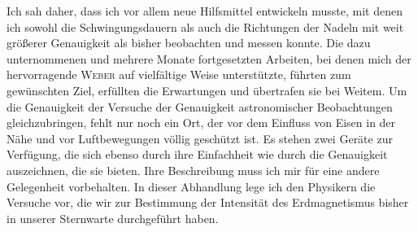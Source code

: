 Ich sah daher, dass ich vor allem neue Hilfsmittel entwickeln musste, mit denen ich sowohl die Schwingungsdauern als auch die Richtungen der Nadeln mit weit größerer Genauigkeit als bisher beobachten und messen konnte. Die dazu unternommenen und mehrere Monate fortgesetzten Arbeiten, bei denen mich der hervorragende \textsc{Weber} auf vielfältige Weise unterstützte, führten zum gewünschten Ziel, erfüllten die Erwartungen und übertrafen sie bei Weitem. Um die Genauigkeit der Versuche der Genauigkeit astronomischer Beobachtungen gleichzubringen, fehlt nur noch ein Ort, der vor dem Einfluss von Eisen in der Nähe und vor Luftbewegungen völlig geschützt ist. Es stehen zwei Geräte zur Verfügung, die sich ebenso durch ihre Einfachheit wie durch die Genauigkeit auszeichnen, die sie bieten. Ihre Beschreibung muss ich mir für eine andere Gelegenheit vorbehalten. In dieser Abhandlung lege ich den Physikern die Versuche vor, die wir zur Bestimmung der Intensität des Erdmagnetismus bisher in unserer Sternwarte durchgeführt haben.
